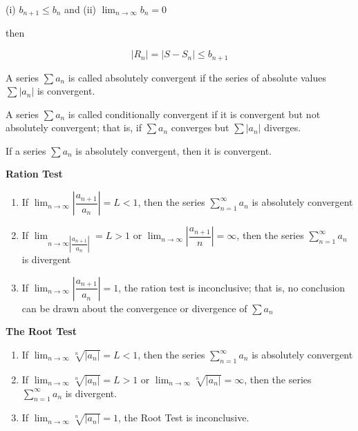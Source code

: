 (i) $b_{n+1} \leq b_n$ and (ii) $\lim_{n \rightarrow \infty} b_n = 0$

then 

$$|R_n| = |S - S_n| \leq b_{n+1}$$ 


\begin{defn}
	A series $\sum a_n$ is called absolutely convergent if the series of absolute values $\sum |a_n|$ is convergent.	
\end{defn}

\begin{defn}
	A series $\sum a_n$ is called conditionally convergent if it is convergent but not absolutely convergent; that is, if $\sum a_n$ converges but $\sum |a_n|$ diverges.	
\end{defn}

\begin{thm*}
	If a series $\sum a_n$ is absolutely convergent, then it is convergent.	
\end{thm*}


\textbf{Ration Test}

\begin{enumerate}[wide,label = $(\roman*)$]
	\item If $\lim_{n \rightarrow \infty}|\dfrac{a_{n+1}}{a_n}| = L < 1$, then the series $\sum^{\infty}_{n = 1}a_n$ is absolutely convergent
	\item If $\lim_{n \rightarrow \infty |\dfrac{a_{n+1}}{a_n}|} = L > 1$ or $\lim_{n \rightarrow \infty}|\dfrac{a_{n+1}}{n}| = \infty$, then the series $\sum^{\infty}_{n = 1}a_n$ is divergent
	\item If $\lim_{n \rightarrow \infty}|\dfrac{a_{n+1}}{a_n}| = 1$, the ration test is inconclusive; that is, no conclusion can be drawn about the convergence or divergence of $\sum a_n$
\end{enumerate}

\textbf{The Root Test}

\begin{enumerate}[wide, label = $(\roman*)$]
	\item If $\lim_{n \rightarrow \infty} \sqrt[n]{|a_n|} = L < 1$, then the series $\sum^{\infty}_{n = 1}a_n$ is absolutely convergent
	\item If $\lim_{n \rightarrow \infty} \sqrt[n]{|a_n|} = L > 1$ or $\lim_{n \rightarrow \infty}\sqrt[n]{|a_n|} = \infty$, then the series $\sum^{\infty}_{n = 1}a_n$ is divergent.
	\item If $\lim_{n \rightarrow \infty}\sqrt[n]{|a_n|} = 1$, the Root Test is inconclusive.
\end{enumerate}


